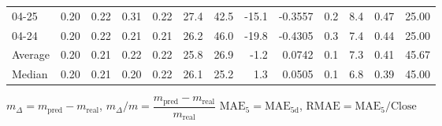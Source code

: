 \begin{threeparttable}
{\begin{tabular}{lrrrrrrrrrrrr}
  04-25 &          0.20 &          0.22 &          0.31 &        0.22 &                27.4 &                42.5 &      -15.1 &      -0.3557 &                 0.2 &              8.4 &            0.47 &                  25.00 \\
  04-24 &          0.20 &          0.22 &          0.21 &        0.21 &                26.2 &                46.0 &      -19.8 &      -0.4305 &                 0.3 &              7.4 &            0.44 &                  25.00 \\
Average &          0.20 &          0.21 &          0.22 &        0.22 &                25.8 &                26.9 &       -1.2 &       0.0742 &                 0.1 &              7.3 &            0.41 &                  45.67 \\
 Median &          0.20 &          0.21 &          0.20 &        0.22 &                26.1 &                25.2 &        1.3 &       0.0505 &                 0.1 &              6.8 &            0.39 &                  45.00 \\
\bottomrule
\end{tabular}
}
\begin{tablenotes}\footnotesize
\item $m_\Delta=m_{\text{pred}}-m_{\text{real}}$,
$m_\Delta/m=\dfrac{m_{\text{pred}}-m_{\text{real}}}{m_{\text{real}}}$
$\mathrm{MAE}_5=\mathrm{MAE}_{5\text{d}}$,
$\mathrm{RMAE}=\mathrm{MAE}_5/\text{Close}$
\end{tablenotes}
\end{threeparttable}
\endgroup

